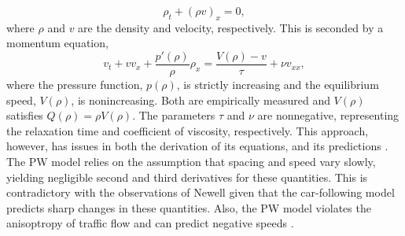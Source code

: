 \documentclass[preprint]{elsarticle}
\begin{document}
\begin{equation}
\rho_t + (\rho v)_x = 0, 
\end{equation}
where $\rho$ and $v$ are the density and velocity, respectively. This is seconded by a momentum equation,
\begin{equation}
v_t+vv_x+\frac{p'\left(\rho\right)}{\rho}\rho_x =\frac{V(\rho)-v}{\tau}+\nu v_{xx} ,
\end{equation}
where the pressure function, $p(\rho)$, is strictly increasing and the equilibrium speed, $V(\rho)$, is nonincreasing. Both are empirically measured and $V(\rho)$ satisfies $Q(\rho) = \rho V(\rho)$. The parameters $\tau$ and $\nu$ are nonnegative, representing the relaxation time and coefficient of viscosity, respectively. This approach, however, has issues in both the derivation of its equations, and its predictions \cite{Dag_requiem}. The PW model relies on the assumption that spacing and speed vary slowly, yielding negligible second and third derivatives for these quantities. This is contradictory with the observations of Newell \cite{Newell} given that the car-following model predicts sharp changes in these quantities. Also, the PW model violates the anisoptropy of traffic flow and can predict negative speeds \cite{Z}.

\end{document}

